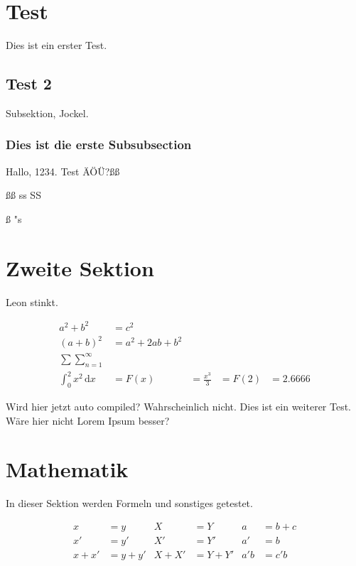 \section{Test}
Dies ist ein erster Test.

\subsection{Test 2}
Subsektion, Jockel.

\subsubsection{Dies ist die erste Subsubsection}

Hallo, 1234. Test ÄÖÜ?ßß

ßß ss SS

ß
"s
\section{Zweite Sektion}
Leon stinkt.

\begin{align}
    a^2+b^2                        & =c^2                                               \\
    (a+b)^2                        & =a^2+2ab+b^2                                       \\
    \sum \sum_{n = 1}^{\infty}                                                          \\
    \int_{0}^{2} x^2 \,\mathrm{d}x & = F(x)       & = \frac{x^3}{3} & = F(2) & = 2.6666
\end{align}

Wird hier jetzt auto compiled? Wahrscheinlich nicht. Dies ist ein weiterer Test. Wäre hier nicht Lorem Ipsum besser?

\section{Mathematik}

In dieser Sektion werden Formeln und sonstiges getestet.

\begin{align}
    \label{eq:C}
    x    & =y    & X    & =Y    & a   & =b+c \\
    \label{eq:D}
    x'   & =y'   & X'   & =Y'   & a'  & =b   \\
    \label{eq:F}
    x+x' & =y+y' & X+X' & =Y+Y' & a'b & =c'b
\end{align}

